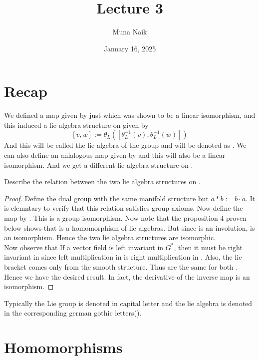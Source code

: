 \documentclass{article}
\title{Lecture 3}
\date{January 16, 2025}
\author{Muna Naik}
\begin{document}
\maketitle

\section*{Recap}

We defined a map  given by just  which was shown to be 
a linear isomorphism, and this induced a lie-algebra structure on  given by $$[v,w] := \theta_L([\theta^{-1}_L(v),\theta^{-1}_L(w)])$$
And this will be called the lie algebra of the group  and will be denoted as . We can also define an anlalogous map  given by  and this will also be a linear isomorphism. And 
we get a different lie algebra structure on .

\begin{exercise*}
    Describe the relation between the two lie algebra structures on .
\end{exercise*}
\begin{proof}
    Define the dual group  with the same manifold structure but $a*b:=b\cdot a$. It is elemntary to verify that this relation 
    satisfies group axioms. Now define the map  by . This is a group isomorphism. Now note that
    the proposition 4 proven below shows that  is a homomorphism of lie algebras. But since \mm{\phi} is an involution,
     is an isomorphism. Hence the two lie algebra structures are isomorphic.\\
    Now observe that If a vector field is left invariant in $G^*$, then it must be right invariant in  since left multiplication in  is 
    right multiplication in . Also, the lie bracket comes only from the smooth structure. Thus are the same for both . Hence we have the desired result.
    In fact, the derivative of the inverse map is an isomorphism. 
\end{proof}

Typically the Lie group is denoted in capital letter and the lie algebra is denoted in the corresponding 
german gothic letters().

\section{Homomorphisms}
\end{document}
